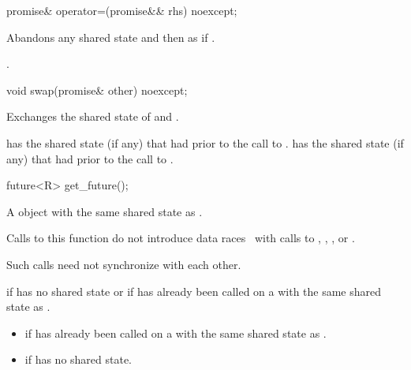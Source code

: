 %
\begin{itemdecl}
promise& operator=(promise&& rhs) noexcept;
\end{itemdecl}

\begin{itemdescr}
\pnum
\effects
Abandons any shared state and then as if
.

\pnum
\returns
{}.
\end{itemdescr}

%
\begin{itemdecl}
void swap(promise& other) noexcept;
\end{itemdecl}

\begin{itemdescr}
\pnum
\effects
Exchanges the shared state of  and .

\pnum
\ensures
{} has the shared state (if any) that  had
prior to the call to .  has the shared state (if any) that
 had prior to the call to .
\end{itemdescr}

%
\begin{itemdecl}
future<R> get_future();
\end{itemdecl}

\begin{itemdescr}
\pnum
\returns
A  object with the same shared state as
.

\pnum
\sync
Calls to this function do not introduce
data races~ with calls to
,
,
, or
.
\begin{note}
Such calls need not synchronize with each other.
\end{note}

\pnum
\throws
{} if  has no shared state or if
 has already been called on a  with the same
shared state as .

\pnum
\errors

\begin{itemize}
\item {} if  has already been called on
a  with the same shared state as .

\item {} if  has no shared state.
\end{itemize}
\end{itemdescr}

